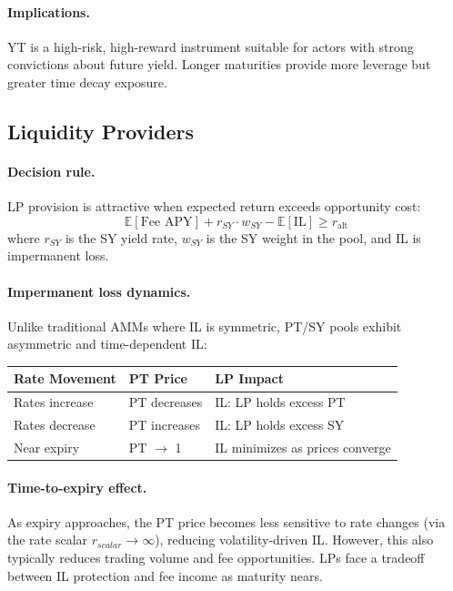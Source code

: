 \paragraph{Implications.}
YT is a high-risk, high-reward instrument suitable for actors with strong convictions about future yield. Longer maturities provide more leverage but greater time decay exposure.

\subsection{Liquidity Providers}

\paragraph{Decision rule.}
LP provision is attractive when expected return exceeds opportunity cost:
\[
\mathbb{E}[\text{Fee APY}] + r_{SY} \cdot w_{SY} - \mathbb{E}[\text{IL}] \geq r_{\mathrm{alt}}
\]
where $r_{SY}$ is the SY yield rate, $w_{SY}$ is the SY weight in the pool, and IL is impermanent loss.

\paragraph{Impermanent loss dynamics.}
Unlike traditional AMMs where IL is symmetric, PT/SY pools exhibit asymmetric and time-dependent IL:

\begin{center}
\begin{tabular}{lll}
\toprule
\textbf{Rate Movement} & \textbf{PT Price} & \textbf{LP Impact} \\
\midrule
Rates increase & PT decreases & IL: LP holds excess PT \\
Rates decrease & PT increases & IL: LP holds excess SY \\
Near expiry & PT $\to$ 1 & IL minimizes as prices converge \\
\bottomrule
\end{tabular}
\end{center}

\paragraph{Time-to-expiry effect.}
As expiry approaches, the PT price becomes less sensitive to rate changes (via the rate scalar $r_{scalar} \to \infty$), reducing volatility-driven IL. However, this also typically reduces trading volume and fee opportunities. LPs face a tradeoff between IL protection and fee income as maturity nears.

